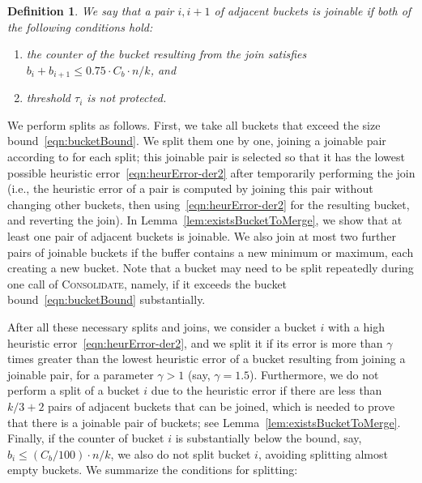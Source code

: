 \documentclass[acmsmall]{acmart}
\newcommand{\consolidate}{\textsc{Consolidate}\xspace}
\newtheorem{definition}[theorem]{Definition}
\theoremstyle{remark}
\begin{document}
\begin{definition}\label{def:joinableBuckets}
    We say that a pair $i, i+1$ of adjacent buckets is \emph{joinable} if both of the following conditions hold:
    \begin{enumerate}[label=(\roman*)]
        \item the counter of the bucket resulting from the join satisfies $b_i + b_{i+1} \le 0.75\cdot C_b \cdot n/k$, and
        \item threshold $\tau_i$ is not \emph{protected}.
    \end{enumerate}
\end{definition}



We perform splits as follows. First, we take all buckets that exceed the size bound~\eqref{eqn:bucketBound}. We split them one by one, joining a joinable pair according to  for each split; this joinable pair is selected so that it has the lowest possible heuristic error~\eqref{eqn:heurError-der2} after temporarily performing the join (i.e., the heuristic error of a pair is computed by joining this pair without changing other buckets, then using~\eqref{eqn:heurError-der2} for the resulting bucket, and reverting the join).
In Lemma~\ref{lem:existsBucketToMerge}, we show that at least one pair of adjacent buckets is joinable.
We also join at most two further pairs of joinable buckets if the buffer contains a new minimum or maximum, each creating a new bucket.
Note that a bucket may need to be split repeatedly during one call of \consolidate, namely, if it exceeds the bucket bound~\eqref{eqn:bucketBound} substantially.

After all these necessary splits and joins, we consider a bucket $i$ with a high heuristic error~\eqref{eqn:heurError-der2}, and we split it if its error is more than $\gamma$ times greater than the lowest heuristic error of a bucket resulting from joining a joinable pair, for a parameter $\gamma > 1$ (say, $\gamma = 1.5$). Furthermore, we do not perform a split of a bucket $i$ due to the heuristic error if there are less than $k/3 + 2$ pairs of adjacent buckets that can be joined, which
is needed to prove that there is a joinable pair of buckets; see Lemma~\ref{lem:existsBucketToMerge}.
Finally, if the counter of bucket $i$ is substantially below the bound, say, $b_i \le (C_b/100) \cdot n/k$,
we also do not split bucket $i$, avoiding splitting almost empty buckets. %
We summarize the conditions for splitting:
\end{document}
